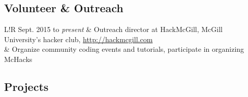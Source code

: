 \documentclass{article}
\newcommand\VRule{\color{lightgray}\vrule width 0.5pt}
\begin{document}
\subsection*{Volunteer \& Outreach}

\begin{tabular}[h]{L!{\VRule}R}
    Sept. 2015 to \emph{present}
        & Outreach director at HackMcGill, McGill University's hacker club,
            \url{http://hackmcgill.com} \\
        & Organize community coding events and tutorials, participate in organizing McHacks
\end{tabular}

\subsection*{Projects}
\end{document}
